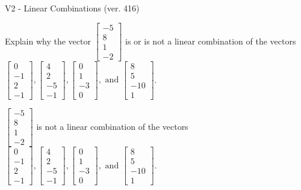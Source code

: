 \begin{exercise}
  \begin{exerciseTitle}V2 - Linear Combinations (ver. 416)\end{exerciseTitle}
  \begin{exerciseStatement}
    Explain why the vector \(\left[\begin{array}{c}
-5 \\
8 \\
1 \\
-2
\end{array}\right]\)  is or is not a linear 
	combination of the vectors \(\left[\begin{array}{c}
0 \\
-1 \\
2 \\
-1
\end{array}\right] , \left[\begin{array}{c}
4 \\
2 \\
-5 \\
-1
\end{array}\right] , \left[\begin{array}{c}
0 \\
1 \\
-3 \\
0
\end{array}\right] , \text{ and } \left[\begin{array}{c}
8 \\
5 \\
-10 \\
1
\end{array}\right]\).
	


  \end{exerciseStatement}
  \begin{exerciseAnswer}
   \(\left[\begin{array}{c}
-5 \\
8 \\
1 \\
-2
\end{array}\right]\) 
  	 is not  
	a linear combination of the vectors \(\left[\begin{array}{c}
0 \\
-1 \\
2 \\
-1
\end{array}\right] , \left[\begin{array}{c}
4 \\
2 \\
-5 \\
-1
\end{array}\right] , \left[\begin{array}{c}
0 \\
1 \\
-3 \\
0
\end{array}\right] , \text{ and } \left[\begin{array}{c}
8 \\
5 \\
-10 \\
1
\end{array}\right]\).


\end{exerciseAnswer}
\end{exercise}
